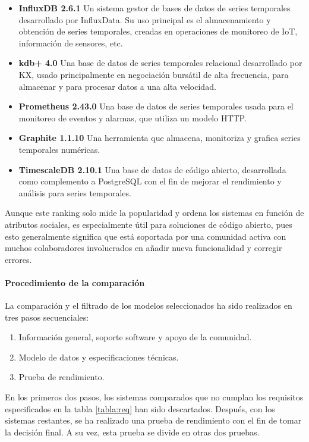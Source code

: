 \begin{itemize}
    \item \textbf{InfluxDB 2.6.1} Un sistema gestor de bases de datos de series temporales desarrollado por InfluxData. Su
        uso principal es el almacenamiento y obtención de series temporales, creadas en operaciones de monitoreo de IoT,
        información de sensores, etc.
    \item \textbf{kdb+ 4.0} Una base de datos de series temporales relacional desarrollado por KX, usado principalmente en
        negociación bursátil de alta frecuencia, para almacenar y para procesar datos a una alta velocidad.
    \item \textbf{Prometheus 2.43.0} Una base de datos de series temporales usada para el monitoreo de eventos y alarmas, que
        utiliza un modelo HTTP.
    \item \textbf{Graphite 1.1.10} Una herramienta que almacena, monitoriza y grafica series temporales numéricas.   
    \item \textbf{TimescaleDB 2.10.1} Una base de datos de código abierto, desarrollada como complemento a PostgreSQL con el
        fin de mejorar el rendimiento y análisis para series temporales.
\end{itemize}

Aunque este ranking solo mide la popularidad y ordena los sistemas en función de atributos sociales, es especialmente
útil para soluciones de código abierto, pues esto generalmente significa que está soportada por una comunidad activa
con muchos colaboradores involucrados en añadir nueva funcionalidad y corregir errores.

\paragraph*{Procedimiento de la comparación}
La comparación y el filtrado de los modelos seleccionados ha sido realizados en tres pasos secuenciales:
\begin{enumerate}
    \item Información general, soporte software y apoyo de la comunidad.
    \item Modelo de datos y especificaciones técnicas.
    \item Prueba de rendimiento.
\end{enumerate}

En los primeros dos pasos, los sistemas comparados que no cumplan los requisitos especificados en la tabla \ref{tabla:req}
han sido descartados. Después, con los sistemas restantes, se ha realizado una prueba de rendimiento con el fin de
tomar la decisión final. A su vez, esta prueba se divide en otras dos pruebas.

